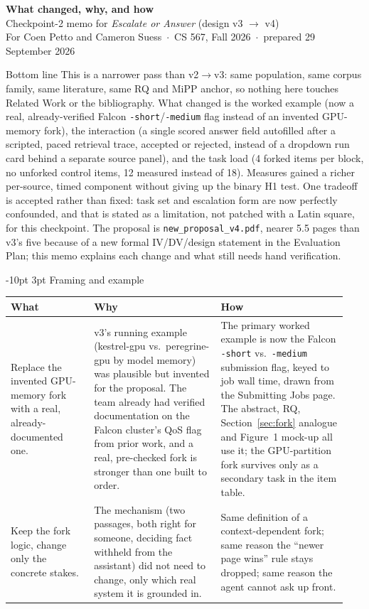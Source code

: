 \documentclass[9pt,letterpaper]{extarticle}
\makeatletter
\newcommand{\rowsep}{\noalign{\vskip 1.5pt}\arrayrulecolor{black!35}\hline\arrayrulecolor{black}\noalign{\vskip 1.5pt}}
\renewcommand\section{\@startsection{section}{1}{\z@}%
  {-10pt \@plus -2pt \@minus -1pt}{3pt}%
  {\sffamily\bfseries\large\color{accent}}}
\let\oldsection\section
\renewcommand{\section}{\needspace{7\baselineskip}\oldsection}
\newcommand{\wwh}{\toprule
\sffamily\bfseries\color{accent} What & \sffamily\bfseries\color{accent} Why & \sffamily\bfseries\color{accent} How \\
\midrule}
\newenvironment{wwhtable}{\footnotesize
\begin{longtable}{@{}>{\raggedright\arraybackslash}p{0.23\linewidth}>{\raggedright\arraybackslash}p{0.355\linewidth}>{\raggedright\arraybackslash}p{0.355\linewidth}@{}}
\wwh}{\bottomrule\end{longtable}}
\makeatother
\begin{document}
{\sffamily
{\Large\bfseries\color{accent} What changed, why, and how}\\[3pt]
{\large Checkpoint-2 memo for \emph{Escalate or Answer} (design v3 $\rightarrow$ v4)}\\[2pt]
{\color{muted} For Coen Petto and Cameron Suess \,$\cdot$\, CS 567, Fall 2026 \,$\cdot$\, prepared 29 September 2026}
}

\vspace{4pt}
\noindent{\color{accent}\rule{\linewidth}{1.2pt}}

\begin{callout}{Bottom line}
This is a narrower pass than v2$\to$v3: same population, same corpus
family, same literature, same RQ and MiPP anchor, so nothing here touches
Related Work or the bibliography. What changed is the worked example (now
a real, already-verified Falcon \texttt{-short}/\texttt{-medium} flag
instead of an invented GPU-memory fork), the interaction (a single scored
answer field autofilled after a scripted, paced retrieval trace, accepted
or rejected, instead of a dropdown run card behind a separate source
panel), and the task load (4 forked items per block, no unforked control
items, 12 measured instead of 18). Measures gained a richer per-source,
timed component without giving up the binary H1 test. One tradeoff is
accepted rather than fixed: task set and escalation form are now perfectly
confounded, and that is stated as a limitation, not patched with a Latin
square, for this checkpoint. The proposal is \texttt{new\_proposal\_v4.pdf},
nearer 5.5 pages than v3's five because of a new formal IV/DV/design
statement in the Evaluation Plan; this memo explains each change and what
still needs hand verification.
\end{callout}

\section{Framing and example}
\begin{wwhtable}
Replace the invented GPU-memory fork with a real, already-documented one. &
v3's running example (kestrel-gpu vs.\ peregrine-gpu by model memory) was
plausible but invented for the proposal. The team already had verified
documentation on the Falcon cluster's QoS flag from prior work, and a real,
pre-checked fork is stronger than one built to order. &
The primary worked example is now the Falcon \texttt{-short} vs.\
\texttt{-medium} submission flag, keyed to job wall time, drawn from the
Submitting Jobs page. The abstract, RQ, Section~\ref{sec:fork} analogue and
Figure~1 mock-up all use it; the GPU-partition fork survives only as a
secondary task in the item table. \\
\rowsep
Keep the fork logic, change only the concrete stakes. &
The mechanism (two passages, both right for someone, deciding fact withheld
from the assistant) did not need to change, only which real system it is
grounded in. &
Same definition of a context-dependent fork; same reason the ``newer page
wins'' rule stays dropped; same reason the agent cannot ask up front. \\
\end{wwhtable}
\end{document}
